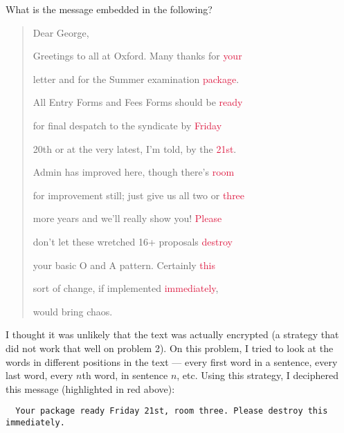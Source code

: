 
\begin{problem}
  What is the message embedded in the following?
  
  \vspace{1ex}
  \begin{quote}
  \begin{sffamily}
  \hspace{2.5ex}Dear George,
  
  Greetings to all at Oxford.  Many thanks for \textcolor{crimson}{your}
  
  letter and for the Summer examination \textcolor{crimson}{package}.
  
  All Entry Forms and Fees Forms should be \textcolor{crimson}{ready}
  
  for final despatch to the syndicate by \textcolor{crimson}{Friday}
  
  20th or at the very latest, I'm told, by the \textcolor{crimson}{21st}.
  
  Admin has improved here, though there's \textcolor{crimson}{room}
  
  for improvement still; just give us all two or \textcolor{crimson}{three}
  
  more years and we'll really show you! \textcolor{crimson}{Please}
  
  don't let these wretched 16+ proposals \textcolor{crimson}{destroy}
  
  your basic O and A pattern.  Certainly \textcolor{crimson}{this}
  
  sort of change, if implemented \textcolor{crimson}{immediately},
  
  would bring chaos.
  \end{sffamily}
  \end{quote}
  \end{problem}
  
  \begin{Answer}
    
  I thought it was unlikely that the text was actually encrypted 
  (a strategy that did not work that well on problem 2).
  On this problem, I tried to look at the words in different positions in the text 
  --- every first word in a sentence, every last word, every $n$th word, in sentence $n$, etc.
  \newline
  \noindent
  Using this strategy, I deciphered this message (highlighted in red above):
  \vspace{10pt}
  \color{crimson}
  \begin{verbatim}
  Your package ready Friday 21st, room three. Please destroy this immediately.
  \end{verbatim}
  \end{Answer}
  